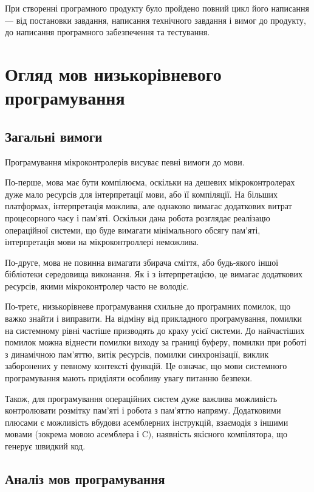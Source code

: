 \documentclass[main.tex]{subfiles}
\begin{document}
При створенні програмного продукту було пройдено повний цикл його написання --- від постановки завдання, написання технічного завдання і вимог до продукту, до написання програмного забезпечення та тестування.

\chapter{Огляд мов низькорівневого програмування}

\newcommand\LangC{C}

\section{Загальні вимоги}

Програмування мікроконтролерів висуває певні вимоги до мови.

По-перше, мова має бути компілюєма, оскільки на дешевих мікроконтролерах дуже мало ресурсів для інтерпретації мови, або її компіляції. На більших платформах, інтерпретація можлива, але однаково вимагає додаткових витрат процесорного часу і пам'яті. Оскільки дана робота розглядає реалізацю операційної системи, що буде вимагати мінімального обсягу пам'яті, інтерпретація мови на мікроконтроллері неможлива.

По-друге, мова не повинна вимагати збирача сміття, або будь-якого іншої бібліотеки середовища виконання. Як і з інтерпретацією, це вимагає додаткових ресурсів, якими мікроконтролер часто не володіє.

По-третє, низькорівневе програмування схильне до програмних помилок, що важко знайти і виправити. На відміну від прикладного програмування, помилки на системному рівні частіше призводять до краху усієї системи. До найчастіших помилок можна віднести помилки виходу за границі буферу, помилки при роботі з динамічною пам'яттю, витік ресурсів, помилки синхронізації, виклик заборонених у певному контексті функцій. Це означає, що мови системного програмування мають приділяти особливу увагу питанню безпеки.

Також, для програмування операційних систем дуже важлива можливість контролювати розмітку пам'яті і робота з пам'яттю напряму. Додатковими плюсами є можливість вбудови асемблерних інструкцій, взаємодія з іншими мовами (зокрема мовою асемблера і \LangC{}), наявність якісного компілятора, що генерує швидкий код.

\section{Аналіз мов програмування}
\end{document}
